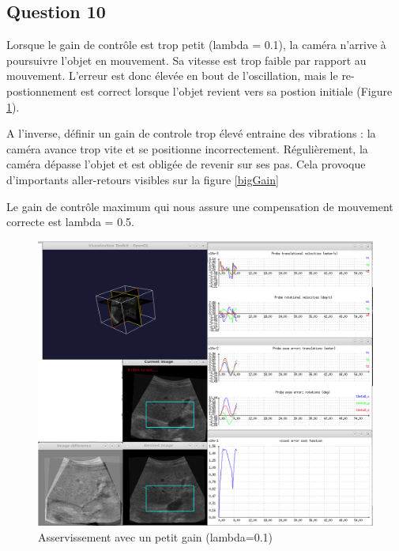 \documentclass[a4paper,11pt]{article}
\begin{document}
\subsection{Question 10}
Lorsque le gain de contr\^ole est trop petit (lambda = 0.1), la cam\'era n'arrive \`a poursuivre l'objet en mouvement. Sa vitesse est trop faible par rapport au mouvement. L'erreur est donc \'elev\'ee en bout de l'oscillation, mais le re-postionnement est correct lorsque l'objet revient vers sa postion initiale (Figure \ref{smallGain}).
\par
A l'inverse, d\'efinir un gain de controle trop \'elev\'e entraine des vibrations : la cam\'era avance trop vite et se positionne incorrectement. R\'eguli\`erement, la cam\'era d\'epasse l'objet et est oblig\'ee de revenir sur ses pas. Cela provoque d'importants aller-retours visibles sur la figure \ref{bigGain}
\par
Le gain de contr\^ole maximum qui nous assure une compensation de mouvement correcte est lambda = 0.5.
\begin{figure}[H]
    \centering
    \includegraphics[width=0.5\textheight]{./images/q10_small.png}
    \caption{Asservissement avec un petit gain (lambda=0.1)}
    \label{smallGain}
\end{figure}
\end{document}
